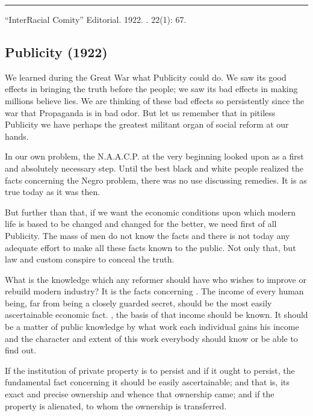 \documentclass[letterpaper,10pt,english]{jupyterBook}
\begin{document}
\bigskip\hrule\bigskip


\sphinxAtStartPar
{} “Inter\sphinxhyphen{}Racial Comity” Editorial. 1922. . 22(1): 6\sphinxhyphen{}7.


\subsection{Publicity (1922)}
\label{\detokenize{Volumes/24/01/publicity:publicity-1922}}\label{\detokenize{Volumes/24/01/publicity::doc}}
\sphinxAtStartPar
We learned during the Great War what Publicity could do. We saw its good effects in bringing the truth before the people; we saw its bad effects in making millions believe lies. We are thinking of these bad effects so persistently since the war that Propaganda is in bad odor. But let us remember that in pitiless Publicity we have perhaps the greatest militant organ of social reform at our hands.

\sphinxAtStartPar
In our own problem, the N.A.A.C.P. at the very beginning looked upon  as a first and absolutely necessary step. Until the best black and white people realized the facts concerning the Negro problem, there was no use discussing remedies. It is as true today as it was then.

\sphinxAtStartPar
But further than that, if we want the economic conditions upon which modern life is based to be changed and changed for the better, we need first of all Publicity. The mass of men do not know the facts and there is not today any adequate effort to make all these facts known to the public. Not only that, but law and custom conspire to conceal the truth.

\sphinxAtStartPar
What is the  knowledge which any reformer should have who wishes to improve or rebuild modern industry? It is the facts concerning . The income of every human being, far from being a closely guarded secret, should be the most easily ascertainable economic fact. , the basis of that income should be known. It should be a matter of public knowledge by what work each individual gains his income and the character and extent of this work everybody should know or be able to find out.

\sphinxAtStartPar
If the institution of private property is to persist and if it ought to persist, the fundamental fact concerning it should be easily ascertainable; and that is, its exact and precise ownership and whence that ownership came; and if the property is alienated, to whom the ownership is transferred.
\end{document}
